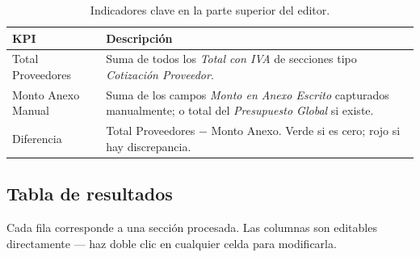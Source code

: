 \documentclass[12pt, a4paper, oneside]{report}
\newcommand{\campo}[1]{\textit{#1}}
\begin{document}
\begin{table}[H]
  \centering
  \begin{tabularx}{\linewidth}{lX}
    \toprule
    \textbf{KPI} & \textbf{Descripción} \\
    \midrule
    Total Proveedores   & Suma de todos los \campo{Total con IVA} de secciones tipo
                          \textit{Cotización Proveedor}. \\
    Monto Anexo Manual  & Suma de los campos \campo{Monto en Anexo Escrito} capturados
                          manualmente; o total del \textit{Presupuesto Global} si existe. \\
    Diferencia          & Total Proveedores $-$ Monto Anexo. \textcolor{greenOk}{Verde}
                          si es cero; \textcolor{redWarn}{rojo} si hay discrepancia. \\
    \bottomrule
  \end{tabularx}
  \caption{Indicadores clave en la parte superior del editor.}
\end{table}

\subsection{Tabla de resultados}

Cada fila corresponde a una sección procesada. Las columnas son editables
directamente — haz doble clic en cualquier celda para modificarla.
\end{document}
